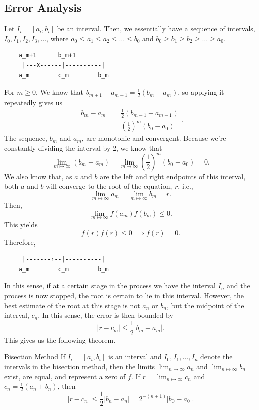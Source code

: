 \documentclass[letterpaper]{article}
\begin{document}
\subsection{Error Analysis}
Let $I_i = [a_i, b_i]$ be an interval. Then, we essentially have a sequence of intervals, $I_0, I_1, I_2, I_3, \hdots$, where $a_0 \leq a_1 \leq a_2 \leq \hdots \leq b_0$ and $b_0 \geq b_1 \geq b_2 \geq \hdots \geq a_0$.

\begin{verbatim}
    a_m+1      b_m+1
     |---X------|----------|
    a_m        c_m        b_m \end{verbatim}
For $m \geq 0$, We know that $b_{m + 1} - a_{m + 1} = \frac{1}{2}(b_m - a_m)$, so applying it repeatedly gives us 
\[\begin{aligned}
    b_m - a_m &= \frac{1}{2}(b_{m -1} - a_{m - 1}) \\ 
        &= \left(\frac{1}{2}\right)^m (b_0 - a_0)
\end{aligned}.\]
The sequence, $b_m$ and $a_m$, are monotonic and convergent. Because we're constantly dividing the interval by 2, we know that 
\[\lim_{m \mapsto \infty} (b_m - a_m) = \lim_{m \mapsto \infty} \left(\frac{1}{2}\right)^m (b_0 - a_0) = 0.\]
We also know that, as $a$ and $b$ are the left and right endpoints of this interval, both $a$ and $b$ will converge to the root of the equation, $r$, i.e.,
\[\lim_{m \mapsto \infty} a_m = \lim_{m \mapsto \infty} b_m = r.\]
Then, 
\[\lim_{m \mapsto \infty} f(a_m) f(b_m) \leq 0.\] 
This yields \[f(r) f(r) \leq 0 \implies f(r) = 0.\]
Therefore,
\begin{verbatim}
     |-------r--|----------|
    a_m        c_m        b_m \end{verbatim}
In this sense, if at a certain stage in the process we have the interval $I_n$ and the process is now stopped, the root is certain to lie in this interval. However, the best estimate of the root at this stage is not $a_n$ or $b_n$, but the midpoint of the interval, $c_n$. In this sense, the error is then bounded by 
\[|r - c_m| \leq \frac{1}{2}|b_m - a_m|.\]
This gives us the following theorem. 
\begin{theorem}{Bisection Method}{}
    If $I_i = [a_i, b_i]$ is an interval and $I_0, I_1, \hdots, I_n$ denote the intervals in the bisection method, then the limits $\lim_{n \mapsto \infty} a_n$ and $\lim_{n \mapsto \infty} b_n$ exist, are equal, and represent a zero of $f$. If $r = \lim_{n \mapsto \infty} c_n$ and $c_n = \frac{1}{2} (a_n + b_n)$, then 
    \[|r - c_n| \leq \frac{1}{2}|b_n - a_n| = 2^{-(n + 1)}|b_0 - a_0|. \]
\end{theorem}
\end{document}
